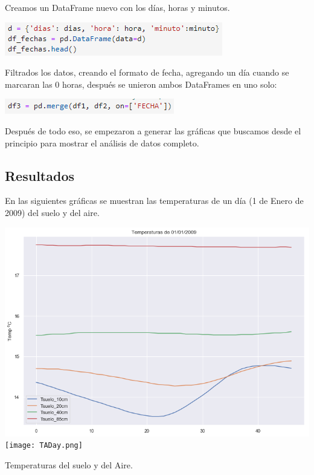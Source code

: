 \documentclass{article}
\begin{document}
Creamos un DataFrame nuevo con los días, horas y minutos.

\begin{center}
    \includegraphics[scale = 0.7]{Dd.png}
\end{center}

Filtrados los datos, creando el formato de fecha, agregando un día cuando se marcaran las 0 horas, después se unieron ambos DataFrames en uno solo:
\begin{center}
    \includegraphics[scale = 0.7]{merge.png}
\end{center}

Después de todo eso, se empezaron a generar las gráficas que buscamos desde el principio para mostrar el análisis de datos completo.
\clearpage

\subsection{Resultados}
En las siguientes gráficas se muestran las temperaturas de un día (1 de Enero de 2009) del suelo y del aire.

\begin{center}
    \includegraphics[scale = 0.3]{TGDay.png}
    \texttt{[image: TADay.png]}
\end{center}

Temperaturas del suelo y del Aire.
\end{document}
